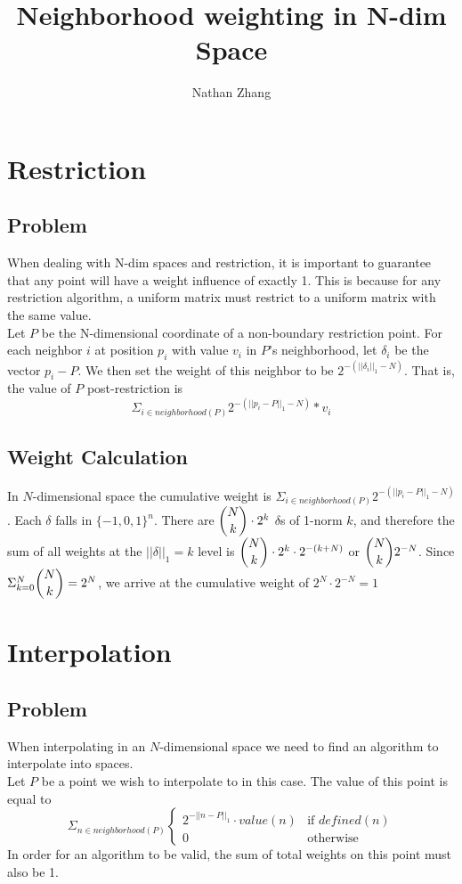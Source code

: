 \documentclass[11pt, oneside]{article}   	%
\title{Neighborhood weighting in N-dim Space}
\author{Nathan Zhang}
\begin{document}
\maketitle

\section{Restriction}
\subsection{Problem}
When dealing with N-dim spaces and restriction, it is important to guarantee that any point will have a weight influence of exactly 1. This is because for any restriction algorithm, a uniform matrix must restrict to a uniform matrix with the same value.\\

Let $P$ be the N-dimensional coordinate of a non-boundary restriction point. For each neighbor $i$ at position $p_i$ with value $v_i$ in $P$'s neighborhood, let $\delta_i$ be the vector $p_i - P$. We then set the weight of this neighbor to be $2^{-(||\delta_i||_1 - N)}$. That is, the value of $P$ post-restriction is $$\Sigma_{i \in neighborhood(P)} 2^{-(||p_i - P||_1 - N)} * v_i$$

\subsection{Weight Calculation}
In $N$-dimensional space the cumulative weight is $\Sigma_{i \in neighborhood(P)} 2^{-(||p_i - P||_1 - N)}$. Each $\delta$ falls in $\{-1, 0, 1\}^n$. There are $\dbinom{N}{k} \cdot 2^k$ $\delta$s of 1-norm $k$, and therefore the sum of all weights at the $||\delta||_1=k$ level is $\dbinom{N}{k} \cdot 2^k \cdot 2^{-(k+N)}$ or $\dbinom{N}{k}2^{-N}$. Since $\Sigma_{k=0}^{N} \dbinom{N}{k} = 2^N$, we arrive at the cumulative weight of $2^N \cdot 2^{-N} = 1$

\section{Interpolation}
\subsection{Problem}
When interpolating in an $N$-dimensional space we need to find an algorithm to interpolate into spaces.\\

Let $P$ be a point we wish to interpolate to in this case. The value of this point is equal to 
$$
\Sigma_{n \in neighborhood(P)}
\begin{cases}
	2^{-||n-P||_1} \cdot value(n)& \text{if } defined(n)\\
	0 & \text{otherwise}
\end{cases}
$$
In order for an algorithm to be valid, the sum of total weights on this point must also be 1.
\end{document}
